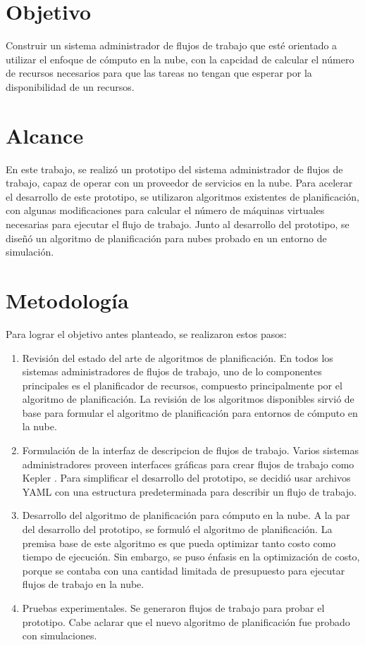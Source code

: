 \section{Objetivo}

Construir un sistema administrador de flujos de trabajo que esté orientado a utilizar el enfoque de cómputo en la nube, con la capcidad de calcular el n\'umero de recursos necesarios para que las tareas no tengan que esperar por la disponibilidad de un recursos.

\section{Alcance}

En este trabajo, se realiz\'o un prototipo del sistema administrador de flujos de trabajo, capaz de operar con un proveedor de servicios en la nube. Para acelerar el desarrollo de este prototipo, se utilizaron algoritmos existentes de planificaci\'on, con algunas modificaciones para calcular el n\'umero de m\'aquinas virtuales necesarias para ejecutar el flujo de trabajo. Junto al desarrollo del prototipo, se dise\~n\'o un algoritmo de planificaci\'on para nubes probado en un entorno de simulaci\'on.


\section{Metodolog\'ia}

Para lograr el objetivo antes planteado, se realizaron estos pasos:

\begin{enumerate}
\item Revisi\'on del estado del arte de algoritmos de planificaci\'on. En todos los sistemas administradores de flujos de trabajo, uno de lo componentes principales es el planificador de recursos, compuesto principalmente por el algoritmo de planificaci\'on. La revisi\'on de los algoritmos disponibles sirvi\'o de base para formular el algoritmo de planificaci\'on para entornos de c\'omputo en la nube.
\item Formulaci\'on de la interfaz de descripcion de flujos de trabajo. Varios sistemas administradores proveen interfaces gr\'aficas para crear flujos de trabajo como Kepler \cite{altintas2016kepler}. Para simplificar el desarrollo del prototipo, se decidi\'o usar archivos YAML con una estructura predeterminada para describir un flujo de trabajo.
\item Desarrollo del algoritmo de planificaci\'on para c\'omputo en la nube. A la par del desarrollo del prototipo, se formul\'o el algoritmo de planificaci\'on. La premisa base de este algoritmo es que pueda optimizar tanto costo como tiempo de ejecuci\'on. Sin embargo, se puso \'enfasis en la optimizaci\'on de costo, porque se contaba con una cantidad limitada de presupuesto para ejecutar flujos de trabajo en la nube. 
\item Pruebas experimentales. Se generaron flujos de trabajo para probar el prototipo. Cabe aclarar que el nuevo algoritmo de planificaci\'on fue probado con simulaciones.
\end{enumerate}

